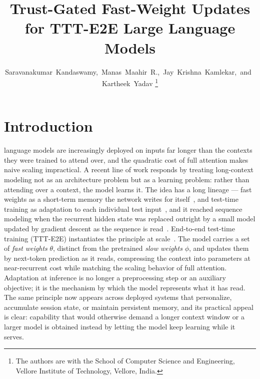 \documentclass[journal]{IEEEtran}
\newcommand{\slow}{\phi}
\newcommand{\fast}{\theta}
\begin{document}
\title{Trust-Gated Fast-Weight Updates for TTT-E2E Large Language Models}

\author{Saravanakumar~Kandaswamy,~Manas~Maahir~R.,~Jay~Krishna~Kamlekar,~and~Kartheek~Yadav%
\thanks{The authors are with the School of Computer Science and Engineering,
Vellore Institute of Technology, Vellore, India.}}

\maketitle

\section{Introduction}

 language models are increasingly deployed on inputs far
longer than the contexts they were trained to attend over, and the quadratic cost
of full attention makes naive scaling impractical. A recent line of work responds
by treating long-context modeling not as an architecture problem but as a learning
problem: rather than attending over a context, the model learns it. The idea has a
long lineage --- fast weights as a short-term memory the network writes for
itself~\cite{ba2016fastweights}, and test-time training as adaptation to each
individual test input~\cite{sun2020ttt}, and it reached sequence modeling when
the recurrent hidden state was replaced outright by a small model updated by
gradient descent as the sequence is read~\cite{sun2024tttlayers}. End-to-end
test-time training (TTT-E2E) instantiates the principle at
scale~\cite{tandon2025tttE2E}. The model carries a set of \emph{fast weights}
$\fast$, distinct from the pretrained \emph{slow weights} $\slow$, and updates them
by next-token prediction as it reads, compressing the context into parameters at
near-recurrent cost while matching the scaling behavior of full attention.
Adaptation at inference is no longer a preprocessing step or an auxiliary
objective; it is the mechanism by which the model represents what it has read. The
same principle now appears across deployed systems that personalize, accumulate
session state, or maintain persistent memory, and its practical appeal is clear:
capability that would otherwise demand a longer context window or a larger model is
obtained instead by letting the model keep learning while it serves.
\end{document}
